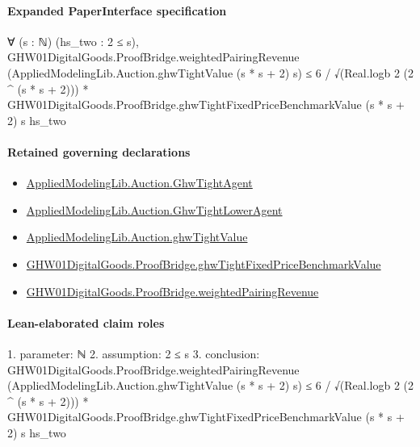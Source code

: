 \documentclass[10pt]{article}
\begin{document}
\paragraph{Expanded PaperInterface specification}
\begin{ReviewVerbatim}
∀ (s : ℕ) (hs_two : 2 ≤ s),
  GHW01DigitalGoods.ProofBridge.weightedPairingRevenue (AppliedModelingLib.Auction.ghwTightValue (s * s + 2) s) ≤
    6 / √(Real.logb 2 (2 ^ (s * s + 2))) *
      GHW01DigitalGoods.ProofBridge.ghwTightFixedPriceBenchmarkValue (s * s + 2) s hs_two
\end{ReviewVerbatim}

\paragraph{Retained governing declarations}
\begin{itemize}\raggedright
\item \hyperlink{governing-declaration-2748d3736759d746}{Applied\allowbreak{}Modeling\allowbreak{}Lib.\allowbreak{}Auction.\allowbreak{}Ghw\allowbreak{}Tight\allowbreak{}Agent}
\item \hyperlink{governing-declaration-19359ce29aee4ce8}{Applied\allowbreak{}Modeling\allowbreak{}Lib.\allowbreak{}Auction.\allowbreak{}Ghw\allowbreak{}Tight\allowbreak{}Lower\allowbreak{}Agent}
\item \hyperlink{governing-declaration-cfa163cb14fdd4d6}{Applied\allowbreak{}Modeling\allowbreak{}Lib.\allowbreak{}Auction.\allowbreak{}ghw\allowbreak{}Tight\allowbreak{}Value}
\item \hyperlink{governing-declaration-7be940960b5539e1}{GHW01\allowbreak{}Digital\allowbreak{}Goods.\allowbreak{}Proof\allowbreak{}Bridge.\allowbreak{}ghw\allowbreak{}Tight\allowbreak{}Fixed\allowbreak{}Price\allowbreak{}Benchmark\allowbreak{}Value}
\item \hyperlink{governing-declaration-e373ea90f301fd9e}{GHW01\allowbreak{}Digital\allowbreak{}Goods.\allowbreak{}Proof\allowbreak{}Bridge.\allowbreak{}weighted\allowbreak{}Pairing\allowbreak{}Revenue}
\end{itemize}
\paragraph{Lean-elaborated claim roles}\begin{ReviewVerbatim}
1. parameter: ℕ
2. assumption: 2 ≤ s
3. conclusion: GHW01DigitalGoods.ProofBridge.weightedPairingRevenue (AppliedModelingLib.Auction.ghwTightValue (s * s + 2) s) ≤
  6 / √(Real.logb 2 (2 ^ (s * s + 2))) *
    GHW01DigitalGoods.ProofBridge.ghwTightFixedPriceBenchmarkValue (s * s + 2) s hs_two
\end{ReviewVerbatim}
\end{document}
